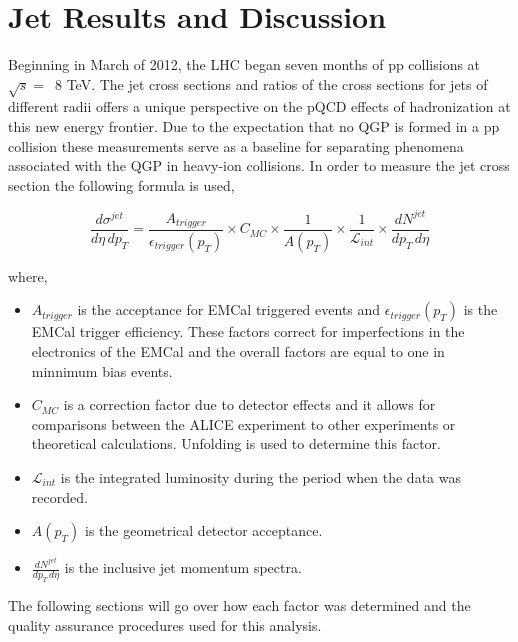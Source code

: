 \chapter{Jet Results and Discussion} \label{ch:analysis}

Beginning in March of 2012, the LHC began seven months of pp collisions at $\sqrt{s} = \,$ 8 TeV.  The jet cross sections and ratios of the cross sections for jets of different radii offers a unique perspective on the pQCD effects of hadronization at this new energy frontier.  Due to the expectation that no QGP is formed in a pp collision these measurements serve as a baseline for separating phenomena associated with the QGP in heavy-ion collisions.  In order to measure the jet cross section the following formula is used,

\begin{equation}
	\frac{d \sigma^{jet}}{d\eta \, dp_{T}} = \frac{A_{trigger}}{\epsilon_{trigger}(p_{T})} \times C_{MC} \times \frac{1}{A(p_{T}) } \times \frac{1}{\mathscr{L}_{int}} \times \frac{dN^{jet}}{dp_{T} \, d\eta}
\label{eq:xsecdef}
\end{equation}

\noindent
where,

\begin{itemize}
  \item $A_{trigger}$ is the acceptance for EMCal triggered events and $\epsilon_{trigger}(p_{T})$ is the EMCal trigger efficiency.  These factors correct for imperfections in the electronics of the EMCal and the overall factors are equal to one in minnimum bias events.
  \item $C_{MC}$ is a correction factor due to detector effects and it allows for comparisons between the ALICE experiment to other experiments or theoretical calculations.  Unfolding is used to determine this factor.
  \item $\mathscr{L}_{int}$ is the integrated luminosity during the period when the data was recorded.
  \item $A(p_{T})$ is the geometrical detector acceptance.
  \item $\frac{dN^{jet}}{dp_{T} \, d\eta}$ is the inclusive jet momentum spectra.
  
\end{itemize}

\noindent
The following sections will go over how each factor was determined and the quality assurance procedures used for this analysis.


